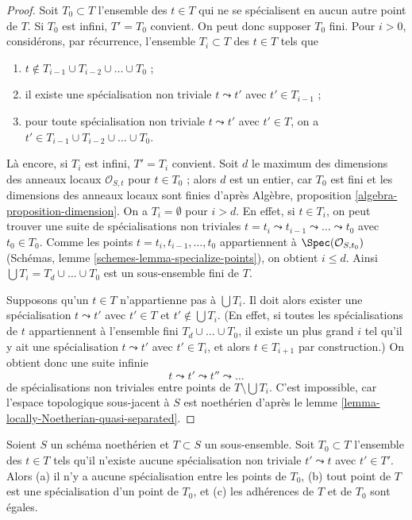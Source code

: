 \begin{proof}
Soit $T_0 \subset T$ l'ensemble des $t \in T$ qui ne se spécialisent
en aucun autre point de $T$. Si $T_0$ est infini, $T' = T_0$ convient.
On peut donc supposer $T_0$ fini.
Pour $i > 0$, considérons, par récurrence, l'ensemble $T_i \subset T$
des $t \in T$ tels que
\begin{enumerate}
\item $t \not \in T_{i - 1} \cup T_{i - 2} \cup \ldots \cup T_0$ ;
\item il existe une spécialisation non triviale $t \leadsto t'$ avec
$t' \in T_{i - 1}$ ;
\item pour toute spécialisation non triviale
$t \leadsto t'$ avec $t' \in T$, on a
$t' \in T_{i - 1} \cup T_{i - 2} \cup \ldots \cup T_0$.
\end{enumerate}
Là encore, si $T_i$ est infini, $T' = T_i$ convient.
Soit $d$ le maximum des dimensions des anneaux locaux
$\mathcal{O}_{S, t}$ pour $t \in T_0$ ; alors $d$ est un entier,
car $T_0$ est fini et les dimensions des anneaux locaux
sont finies d'après Algèbre, proposition \ref{algebra-proposition-dimension}.
On a $T_i = \emptyset$ pour $i > d$.
En effet, si $t \in T_i$, on peut trouver une suite
de spécialisations non triviales
$t = t_i \leadsto t_{i - 1} \leadsto \ldots \leadsto t_0$
avec $t_0 \in T_0$. Comme
les points $t = t_i, t_{i - 1}, \ldots, t_0$ appartiennent à
$\Spec(\mathcal{O}_{S, t_0})$
(Schémas, lemme \ref{schemes-lemma-specialize-points}),
on obtient $i \leq d$.
Ainsi $\bigcup T_i = T_d \cup \ldots \cup T_0$ est un sous-ensemble fini de $T$.

\medskip\noindent
Supposons qu'un $t \in T$ n'appartienne pas à $\bigcup T_i$. Il doit alors exister une spécialisation
$t \leadsto t'$ avec $t' \in T$ et $t' \not \in \bigcup T_i$. (En effet, si
toutes les spécialisations de $t$ appartiennent à l'ensemble fini $T_d \cup \ldots \cup T_0$,
il existe un plus grand $i$ tel qu'il y ait une spécialisation
$t \leadsto t'$ avec $t' \in T_i$, et alors $t \in T_{i + 1}$ par construction.)
On obtient donc une suite infinie
$$
t \leadsto t' \leadsto t'' \leadsto \ldots
$$
de spécialisations non triviales entre points de $T \setminus \bigcup T_i$.
C'est impossible, car l'espace topologique sous-jacent à $S$
est noethérien d'après le lemme \ref{lemma-locally-Noetherian-quasi-separated}.
\end{proof}

\begin{lemma}
\label{lemma-maximal-points}
Soient $S$ un schéma noethérien et $T \subset S$ un sous-ensemble. Soit
$T_0 \subset T$ l'ensemble des $t \in T$ tels qu'il n'existe aucune spécialisation
non triviale $t' \leadsto t$ avec $t' \in T'$. Alors (a) il n'y a
aucune spécialisation entre les points de $T_0$, (b) tout point de
$T$ est une spécialisation d'un point de $T_0$, et (c) les adhérences
de $T$ et de $T_0$ sont égales.
\end{lemma}

